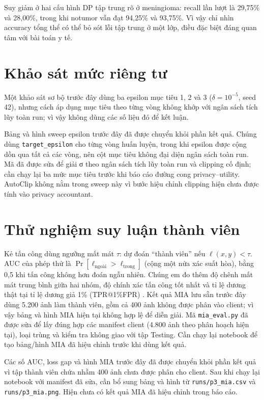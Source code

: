 \documentclass[12pt,a4paper]{report}
\begin{document}
Suy giảm ở hai cấu hình DP tập trung rõ ở meningioma: recall lần lượt là 29,75\% và 28,00\%, trong khi notumor vẫn đạt 94,25\% và 93,75\%. Vì vậy chỉ nhìn accuracy tổng thể có thể bỏ sót lỗi tập trung ở một lớp, điều đặc biệt đáng quan tâm với bài toán y tế.

\section{Khảo sát mức riêng tư}
Một khảo sát sơ bộ trước đây dùng ba epsilon mục tiêu 1, 2 và 3 ($\delta=10^{-5}$, seed 42), nhưng cách áp dụng mục tiêu theo từng vòng không khớp với ngân sách tích lũy toàn run; vì vậy không dùng các số liệu đó để kết luận.

\noindent Bảng và hình sweep epsilon trước đây đã được chuyển khỏi phần kết quả. Chúng dùng \texttt{target\_epsilon} cho từng vòng huấn luyện, trong khi epsilon được cộng dồn qua tất cả các vòng, nên cột mục tiêu không đại diện ngân sách toàn run. Mã đã được sửa để giải σ theo ngân sách tích lũy toàn run và clipping cố định; cần chạy lại ba mức mục tiêu trước khi báo cáo đường cong privacy--utility. AutoClip không nằm trong sweep này vì bước hiệu chỉnh clipping hiện chưa được tính vào privacy accountant.

\section{Thử nghiệm suy luận thành viên}
Kẻ tấn công dùng ngưỡng mất mát $\tau$: dự đoán ``thành viên'' nếu $\ell(x,y)<\tau$. AUC của phép thử là $\Pr[\ell_{\text{ngoài}}>\ell_{\text{trong}}]$ (cộng một nửa xác suất hòa), bằng 0,5 khi tấn công không hơn đoán ngẫu nhiên. Chúng em đo thêm độ chênh mất mát trung bình giữa hai nhóm, độ chính xác tấn công tốt nhất và tỉ lệ dương thật tại tỉ lệ dương giả 1\% (TPR@1\%FPR) \citep{carlini}. Kết quả MIA lưu sẵn trước đây dùng 5.200 ảnh làm thành viên, gồm cả 400 ảnh không được phân vào client; vì vậy bảng và hình MIA hiện tại không hợp lệ để diễn giải. Mã \texttt{mia\_eval.py} đã được sửa để lấy đúng hợp các manifest client (4.800 ảnh theo phân hoạch hiện tại), loại trùng và kiểm tra không giao với tập Testing. Cần chạy lại notebook để tạo bảng/hình MIA đã hiệu chỉnh trước khi dùng kết quả.

\noindent Các số AUC, loss gap và hình MIA trước đây đã được chuyển khỏi phần kết quả vì tập thành viên chứa nhầm 400 ảnh chưa được phân cho client. Sau khi chạy lại notebook với manifest đã sửa, cần bổ sung bảng và hình từ \texttt{runs/p3\_mia.csv} và \texttt{runs/p3\_mia.png}. Hiện chưa có kết quả MIA đã hiệu chỉnh trong báo cáo.
\end{document}
